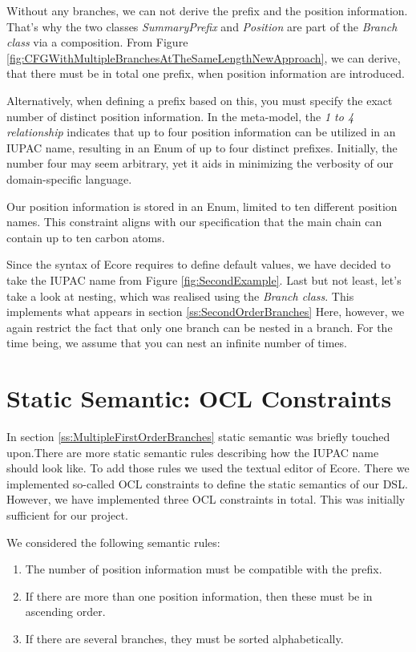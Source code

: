 \documentclass[
fontsize=11pt,
paper=a4,
abstract=true,
numbers=noenddot,
listof=totoc,
bibliography=totoc,
twoside,
open=right,
cleardoublepage=plain,
parskip=half+, %
BCOR=1cm, %
]{scrreprt}
\begin{document}
Without any branches, we can not derive the prefix and the position information. That's why the two classes \emph{SummaryPrefix} and \emph{Position} are part of the \emph{Branch class} via a composition. From Figure \ref{fig:CFGWithMultipleBranchesAtTheSameLengthNewApproach}, we can derive, that there must be in total one prefix, when position information are introduced.

Alternatively, when defining a prefix based on this, you must specify the exact number of distinct position information. In the meta-model, the \emph{1 to 4 relationship} indicates that up to four position information can be utilized in an IUPAC name, resulting in an Enum of up to four distinct prefixes. Initially, the number four may seem arbitrary, yet it aids in minimizing the verbosity of our domain-specific language. 

Our position information is stored in an Enum, limited to ten different position names. This constraint aligns with our specification that the main chain can contain up to ten carbon atoms. 

Since the syntax of Ecore requires to define default values, we have decided to take the IUPAC name from Figure \ref{fig:SecondExample}. Last but not least, let's take a look at nesting, which was realised using the \emph{Branch class}. This implements what appears in section \ref{ss:SecondOrderBranches} Here, however, we again restrict the fact that only one branch can be nested in a branch. For the time being, we assume that you can nest an infinite number of times. \\


\section{Static Semantic: OCL Constraints}\label{ss:StaticSemantic:OCLConstraints}

In section \ref{ss:MultipleFirstOrderBranches} static semantic was briefly touched upon.There are more static semantic rules describing how the IUPAC name should look like. To add those rules we used the textual editor of Ecore. There we implemented so-called OCL constraints to define the static semantics of our DSL. However, we have implemented three OCL constraints in total. This was initially sufficient for our project.  

We considered the following semantic rules:  

\begin{enumerate}
    \item The number of position information must be compatible with the prefix.
    \item If there are more than one position information, then these must be in ascending order.
    \item If there are several branches, they must be sorted alphabetically. 
\end{enumerate} 
\end{document}
